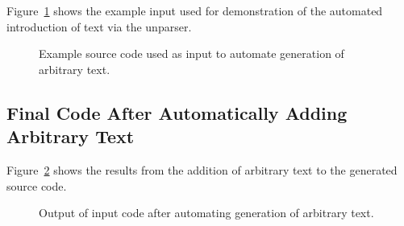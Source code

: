    Figure~\ref{Tutorial:exampleInputCode_addArbitraryText}
shows the example input used for demonstration of the automated introduction of text via
the unparser.

\begin{figure}[!h]
{\indent
{\mySmallFontSize

\begin{latexonly}
   
\end{latexonly}

\begin{htmlonly}
   
\end{htmlonly}

}
}
\caption{Example source code used as input to automate generation of arbitrary text.}
\label{Tutorial:exampleInputCode_addArbitraryText}
\end{figure}



\subsection{Final Code After Automatically Adding Arbitrary Text}

   Figure~\ref{Tutorial:exampleOutput_addArbitraryText} 
shows the results from the addition of arbitrary text to the generated source code.

\begin{figure}[!h]
{\indent
{\mySmallFontSize

\begin{latexonly}
   
\end{latexonly}

\begin{htmlonly}
   
\end{htmlonly}

}
}
\caption{Output of input code after automating generation of arbitrary text.}
\label{Tutorial:exampleOutput_addArbitraryText}
\end{figure}




























